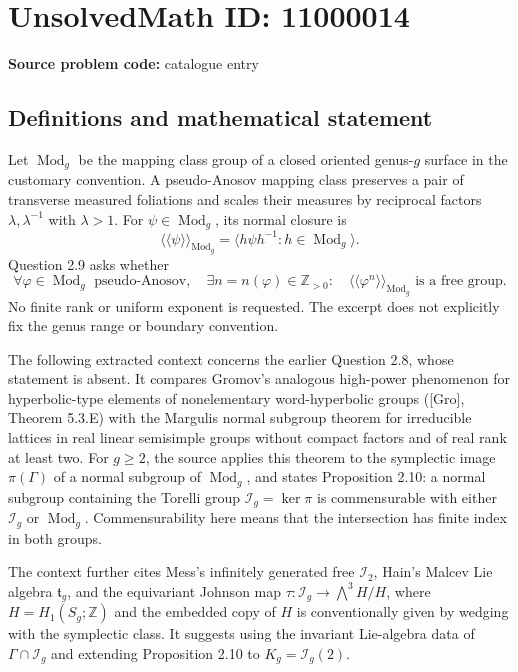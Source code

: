 \documentclass[11pt]{article}
\newcommand{\Z}{\mathbb{Z}}
\begin{document}
\section*{UnsolvedMath ID: 11000014}
\textbf{Source problem code:} catalogue entry
\subsection{Definitions and mathematical statement}
Let $\operatorname{Mod}_g$ be the mapping class group of a closed oriented genus-$g$ surface in the customary convention. A pseudo-Anosov mapping class preserves a pair of transverse measured foliations and scales their measures by reciprocal factors $\lambda,\lambda^{-1}$ with $\lambda>1$. For $\psi\in\operatorname{Mod}_g$, its normal closure is
\[
 \langle\!\langle\psi\rangle\!\rangle_{\operatorname{Mod}_g}
 =\langle h\psi h^{-1}:h\in\operatorname{Mod}_g\rangle.
\]
Question 2.9 asks whether
\[
 \forall\varphi\in\operatorname{Mod}_g\text{ pseudo-Anosov},\quad
 \exists n=n(\varphi)\in\Z_{>0}:\quad
 \langle\!\langle\varphi^n\rangle\!\rangle_{\operatorname{Mod}_g}
 \text{ is a free group}.
\]
No finite rank or uniform exponent is requested. The excerpt does not explicitly fix the genus range or boundary convention.

The following extracted context concerns the earlier Question 2.8, whose statement is absent. It compares Gromov's analogous high-power phenomenon for hyperbolic-type elements of nonelementary word-hyperbolic groups ([Gro], Theorem 5.3.E) with the Margulis normal subgroup theorem for irreducible lattices in real linear semisimple groups without compact factors and of real rank at least two. For $g\geq2$, the source applies this theorem to the symplectic image $\pi(\Gamma)$ of a normal subgroup of $\operatorname{Mod}_g$, and states Proposition 2.10: a normal subgroup containing the Torelli group $\mathcal I_g=\ker\pi$ is commensurable with either $\mathcal I_g$ or $\operatorname{Mod}_g$. Commensurability here means that the intersection has finite index in both groups.

The context further cites Mess's infinitely generated free $\mathcal I_2$, Hain's Malcev Lie algebra $\mathfrak t_g$, and the equivariant Johnson map $\tau:\mathcal I_g\to\bigwedge^3H/H$, where $H=H_1(S_g;\Z)$ and the embedded copy of $H$ is conventionally given by wedging with the symplectic class. It suggests using the invariant Lie-algebra data of $\Gamma\cap\mathcal I_g$ and extending Proposition 2.10 to $K_g=\mathcal I_g(2)$.
\end{document}
